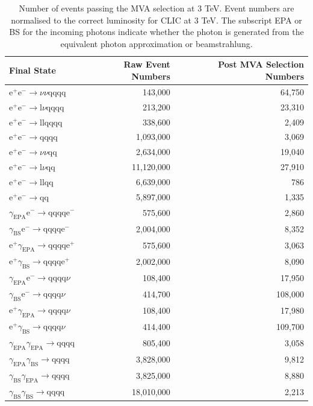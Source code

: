 \begin{table}[h!]
\centering
\begin{tabular}{ l r r }
\hline
Final State & Raw Event Numbers & Post MVA Selection Numbers \\ 
\hline
$\text{e}^{+}\text{e}^{-} \rightarrow \nu{\nu}\text{qqqq}$ & 143,000 & 64,750 \\
$\text{e}^{+}\text{e}^{-} \rightarrow \text{l}\nu\text{qqqq}$ & 213,200 & 23,310 \\
$\text{e}^{+}\text{e}^{-} \rightarrow \text{llqqqq}$ & 338,600 & 2,409 \\
$\text{e}^{+}\text{e}^{-} \rightarrow \text{qqqq}$ & 1,093,000 & 3,069 \\
$\text{e}^{+}\text{e}^{-} \rightarrow \nu{\nu}\text{qq}$ & 2,634,000 & 19,040 \\
$\text{e}^{+}\text{e}^{-} \rightarrow \text{l}\nu\text{qq}$ & 11,120,000 & 27,910 \\
$\text{e}^{+}\text{e}^{-} \rightarrow \text{llqq}$ & 6,639,000 & 786 \\
$\text{e}^{+}\text{e}^{-} \rightarrow \text{qq}$ & 5,897,000 & 1,335 \\
$\gamma_{\text{EPA}}\text{e}^{-} \rightarrow \text{qqqq}\text{e}^{-}$ & 575,600 & 2,860 \\
$\gamma_{\text{BS}}\text{e}^{-} \rightarrow \text{qqqq}\text{e}^{-}$ & 2,004,000 & 8,352 \\
$\text{e}^{+}\gamma_{\text{EPA}} \rightarrow \text{qqqq}\text{e}^{+}$ & 575,600 & 3,063 \\
$\text{e}^{+}\gamma_{\text{BS}} \rightarrow \text{qqqq}\text{e}^{+}$ & 2,002,000 & 8,090 \\
$\gamma_{\text{EPA}}\text{e}^{-} \rightarrow \text{qqqq}\nu$ & 108,400 & 17,950 \\
$\gamma_{\text{BS}}\text{e}^{-} \rightarrow \text{qqqq}\nu$ & 414,700 & 108,000 \\
$\text{e}^{+}\gamma_{\text{EPA}} \rightarrow \text{qqqq}\nu$ & 108,400 & 17,980 \\
$\text{e}^{+}\gamma_{\text{BS}} \rightarrow \text{qqqq}\nu$ & 414,400 & 109,700 \\
$\gamma_{\text{EPA}}\gamma_{\text{EPA}} \rightarrow \text{qqqq}$ & 805,400 & 3,058 \\
$\gamma_{\text{EPA}}\gamma_{\text{BS}} \rightarrow \text{qqqq}$ & 3,828,000 & 9,812 \\
$\gamma_{\text{BS}}\gamma_{\text{EPA}} \rightarrow \text{qqqq}$ & 3,825,000 & 8,880 \\
$\gamma_{\text{BS}}\gamma_{\text{BS}} \rightarrow \text{qqqq}$ & 18,010,000 & 2,213 \\
\hline
\end{tabular}
\caption[Number of events passing the MVA selection at 3 TeV.]{Number of events passing the MVA selection at 3 TeV.  Event numbers are normalised to the correct luminosity for CLIC at 3 TeV.   The subscript EPA or BS for the incoming photons indicate whether the photon is generated from the equivalent photon approximation or beamstrahlung.}
\label{table:postmvanumbers3000GeV}
\end{table}

